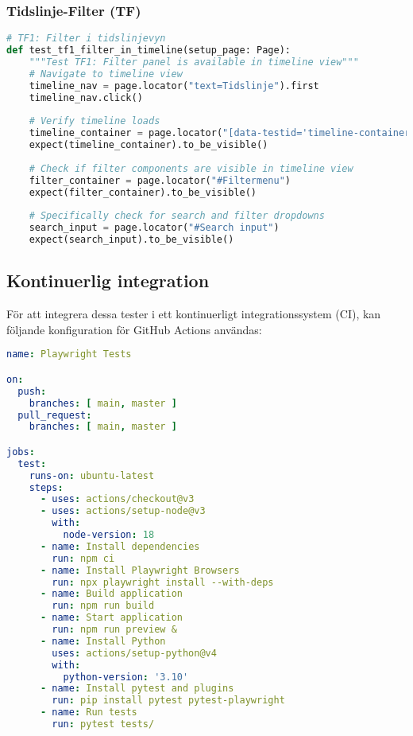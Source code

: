 \subsubsection{Tidslinje-Filter (TF)}

\begin{lstlisting}[language=python]
# TF1: Filter i tidslinjevyn
def test_tf1_filter_in_timeline(setup_page: Page):
    """Test TF1: Filter panel is available in timeline view"""
    # Navigate to timeline view
    timeline_nav = page.locator("text=Tidslinje").first
    timeline_nav.click()
    
    # Verify timeline loads
    timeline_container = page.locator("[data-testid='timeline-container']")
    expect(timeline_container).to_be_visible()
    
    # Check if filter components are visible in timeline view
    filter_container = page.locator("#Filtermenu")
    expect(filter_container).to_be_visible()
    
    # Specifically check for search and filter dropdowns
    search_input = page.locator("#Search input")
    expect(search_input).to_be_visible()
\end{lstlisting}

\subsection{Kontinuerlig integration}

För att integrera dessa tester i ett kontinuerligt integrationssystem (CI), kan följande konfiguration för GitHub Actions användas:

\begin{lstlisting}[language=yaml]
name: Playwright Tests

on:
  push:
    branches: [ main, master ]
  pull_request:
    branches: [ main, master ]

jobs:
  test:
    runs-on: ubuntu-latest
    steps:
      - uses: actions/checkout@v3
      - uses: actions/setup-node@v3
        with:
          node-version: 18
      - name: Install dependencies
        run: npm ci
      - name: Install Playwright Browsers
        run: npx playwright install --with-deps
      - name: Build application
        run: npm run build
      - name: Start application
        run: npm run preview &
      - name: Install Python
        uses: actions/setup-python@v4
        with:
          python-version: '3.10'
      - name: Install pytest and plugins
        run: pip install pytest pytest-playwright
      - name: Run tests
        run: pytest tests/
\end{lstlisting}

